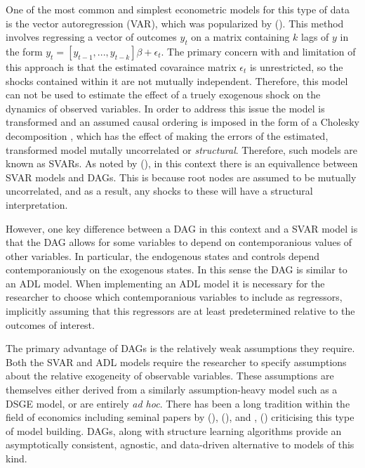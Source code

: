 \documentclass{article}
\begin{document}
One of the most common and simplest econometric models for this type of data is the vector autoregression (VAR), which was popularized by \citeauthor{sims1980macroeconomics} (\citeyear{sims1980macroeconomics}). This method involves regressing a vector of outcomes $y_t$ on a matrix containing $k$ lags of $y$ in the form $y_t = [y_{t-1}, ..., y_{t-k}] \beta + \epsilon_t $. The primary concern with and limitation of this approach is that the estimated covaraince matrix $\epsilon_t$ is unrestricted, so the shocks contained within it are not mutually independent. Therefore, this model can not be used to estimate the effect of a truely exogenous shock on the dynamics of observed variables. In order to address this issue the model is transformed and an assumed causal ordering is imposed in the form of a Cholesky decomposition \parencite{sims1980macroeconomics}, which has the effect of making the errors of the estimated, transformed model mutally uncorrelated or \textit{structural}. Therefore, such models are known as SVARs. As noted by \citeauthor{demiralp2003searching} (\citeyear{demiralp2003searching}), in this context there is an equivallence between SVAR models and DAGs. This is because root nodes are assumed to be mutually uncorrelated, and as a result, any shocks to these will have a structural interpretation.

However, one key difference between a DAG in this context and a SVAR model is that the DAG allows for some variables to depend on contemporanious values of other variables. In particular, the endogenous states and controls depend contemporaniously on the exogenous states. In this sense the DAG is similar to an ADL model. When implementing an ADL model it is necessary for the researcher to choose which contemporanious variables to include as regressors, implicitly assuming that this regressors are at least predetermined relative to the outcomes of interest. 

The primary advantage of DAGs is the relatively weak assumptions they require. Both the SVAR and ADL models require the researcher to specify assumptions about the relative exogeneity of observable variables. These assumptions are themselves either derived from a similarly assumption-heavy model such as a DSGE model, or are entirely \textit{ad hoc}. There has been a long tradition within the field of economics including seminal papers by \citeauthor{lucas1976econometric} (\citeyear{lucas1976econometric}), \citeauthor{sims1980macroeconomics} (\citeyear{sims1980macroeconomics}), and \citeauthor{jorda2005estimation}, (\citeyear{jorda2005estimation}) criticising this type of model building. DAGs, along with structure learning algorithms provide an asymptotically consistent, agnostic, and data-driven alternative to models of this kind. 
\end{document}
